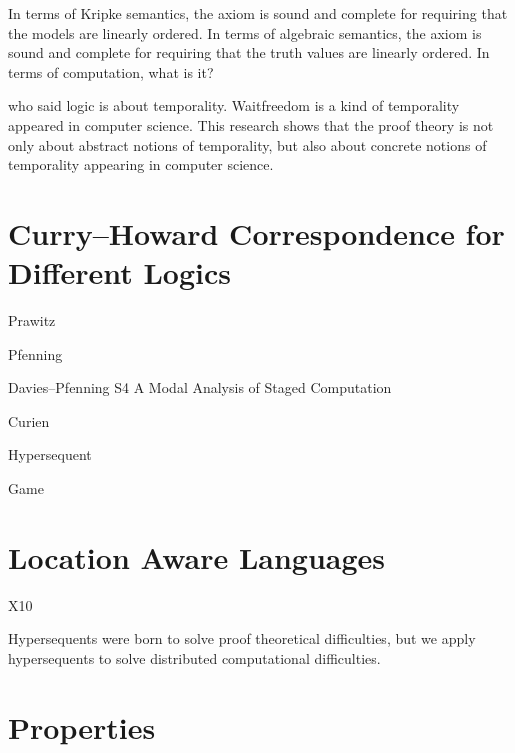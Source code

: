 In terms of Kripke semantics, the axiom is sound and complete for
requiring that the models are linearly ordered.
In terms of algebraic semantics, the axiom is sound and complete for
requiring that the truth values are linearly ordered.  
In terms of computation, what is it?


who said logic is about temporality.
Waitfreedom is a kind of temporality appeared in computer science.
This research shows that the proof theory is not only about abstract
notions of temporality, but also about concrete notions of temporality
appearing in computer science.

\section{Curry--Howard Correspondence for Different Logics}

Prawitz

Pfenning

Davies--Pfenning S4 A Modal Analysis of Staged Computation

Curien

Hypersequent

Game

\section{Location Aware Languages}

X10


Hypersequents were born to solve proof theoretical difficulties, but we
apply hypersequents to solve distributed computational difficulties.

\section{Properties}
